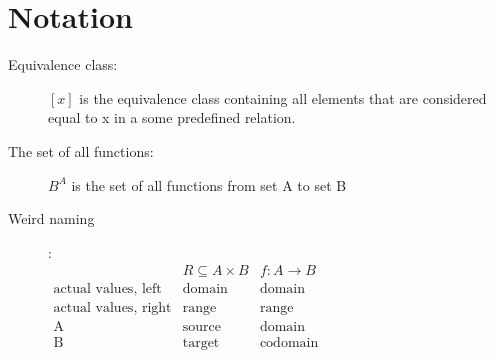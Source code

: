 \documentclass[12pt]{article}
\begin{document}
\section{Notation}

\begin{description}
\item[Equivalence class:] $[x]$ is the equivalence class containing all elements that are considered equal to x in a some predefined relation.

\item[The set of all functions:] $B^A$ is the set of all functions from set A to set B

\item[Weird naming]: \\
\begin{math} \begin{array}{ccc}
& R \subseteq A \times B & f: A \rightarrow B \\
\textrm{actual values, left} & \textrm{domain} & \textrm{domain}\\
\textrm{actual values, right} & \textrm{range} & \textrm{range} \\
\textrm{A} & \textrm{source} & \textrm{domain} \\
\textrm{B} & \textrm{target} & \textrm{codomain} 
\end{array}
\end{math}

\end{description}
\end{document}
